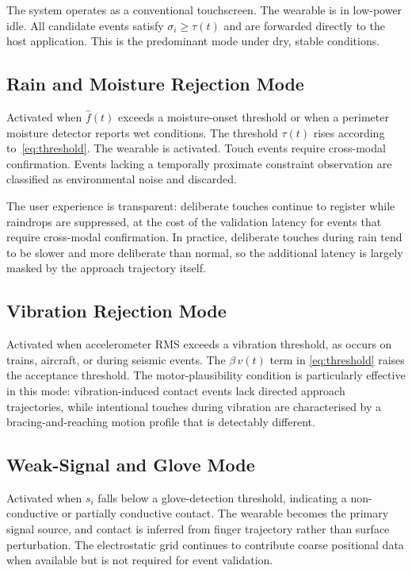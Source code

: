 \documentclass[11pt,letterpaper]{article}
\begin{document}
The system operates as a conventional touchscreen. The wearable is in low-power
idle. All candidate events satisfy $\sigma_i \geq \tau(t)$ and are forwarded
directly to the host application. This is the predominant mode under dry, stable
conditions.

\subsection{Rain and Moisture Rejection Mode}

Activated when $\hat{f}(t)$ exceeds a moisture-onset threshold or when a perimeter
moisture detector reports wet conditions. The threshold $\tau(t)$ rises according
to~\eqref{eq:threshold}. The wearable is activated. Touch events require
cross-modal confirmation. Events lacking a temporally proximate constraint
observation are classified as environmental noise and discarded.

The user experience is transparent: deliberate touches continue to register while
raindrops are suppressed, at the cost of the validation latency for events that
require cross-modal confirmation. In practice, deliberate touches during rain tend
to be slower and more deliberate than normal, so the additional latency is largely
masked by the approach trajectory itself.

\subsection{Vibration Rejection Mode}

Activated when accelerometer RMS exceeds a vibration threshold, as occurs on
trains, aircraft, or during seismic events. The $\beta\,v(t)$ term in
\eqref{eq:threshold} raises the acceptance threshold. The motor-plausibility
condition is particularly effective in this mode: vibration-induced contact events
lack directed approach trajectories, while intentional touches during vibration
are characterised by a bracing-and-reaching motion profile that is detectably
different.

\subsection{Weak-Signal and Glove Mode}

Activated when $s_i$ falls below a glove-detection threshold, indicating a
non-conductive or partially conductive contact. The wearable becomes the primary
signal source, and contact is inferred from finger trajectory rather than surface
perturbation. The electrostatic grid continues to contribute coarse positional data
when available but is not required for event validation.
\end{document}

